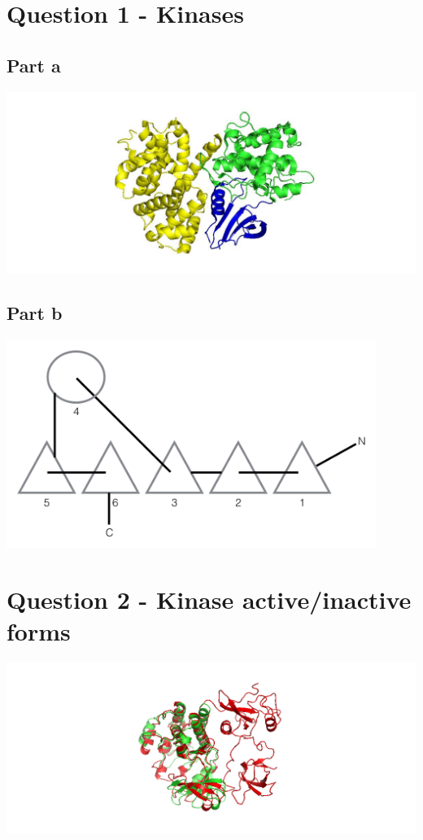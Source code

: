 \documentclass[11pt, a4paper,titlepage]{article}
\begin{document}
\setlength{\parskip}{0pt}%
\setlength{\parindent}{0pt}%
\renewcommand{\thesubsubsection}{\alph{subsubsection}.)}

\setcounter{tocdepth}{3}
\tableofcontents
\clearpage


\section{Question 1 - Kinases}
\subsection{Part a}
\includegraphics[width=15cm]{./Figures/1a.jpg}

\subsection{Part b}
\includegraphics[width=12cm]{./Figures/1b.png}

\section{Question 2 - Kinase active/inactive forms}
\includegraphics[width=15cm]{./Figures/2a.png}
\end{document}
